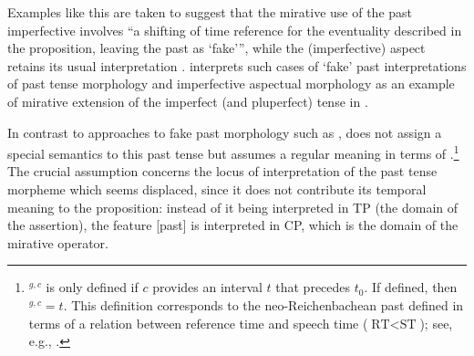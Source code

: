 \documentclass[output=paper]{langscibook}
\begin{document}
\noindent Examples like this are taken to suggest that the mirative use of the past imperfective involves ``a shifting of time reference for the eventuality described in the proposition, leaving the past as `fake'{''}, while the (imperfective) aspect retains its usual interpretation \citep[6]{Bustamante2013}. \citeauthor{Bustamante2013} interprets such cases of `fake' past interpretations of past tense morphology and imperfective aspectual morphology as an example of mirative extension of the imperfect (and pluperfect) tense in .
%
%

In contrast to approaches to fake past morphology such as \citet{Iatridou2000}, \citeauthor{Bustamante2013} does not assign a special semantics to this past tense but assumes a regular meaning in terms of \citet[10]{Kratzer1998}.\footnote{$^{g,c}$ is only defined if $c$ provides an interval $t$ that precedes $t_0$. If defined, then $^{g,c}=t$. This definition corresponds to the neo-Reichenbachean past defined in terms of a relation between reference time and speech time ($\text{RT}<\text{ST}$); see, e.g., \citet{Klein1994}.}
The crucial assumption concerns the locus of interpretation of the past tense morpheme which seems displaced, since it does not contribute its temporal meaning to the proposition:
instead of it being interpreted in TP (the domain of the assertion), the feature [past] is interpreted in CP, which is the domain of the mirative operator.
\end{document}
